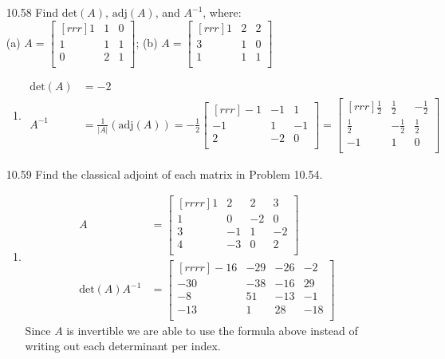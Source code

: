 \documentclass[12pt]{article}
\theoremstyle{definition}
\theoremstyle{plain}
\begin{document}
\begin{enumerate}
\item[10.58]Find $\mathrm{det}(A)$, $\mathrm{adj}(A)$, and $A^{-1}$, where:\\
(a) $A=\begin{bmatrix}[rrr]1&1&0\\1&1&1\\0&2&1\\\end{bmatrix}$; (b) $A=\begin{bmatrix}[rrr]1&2&2\\3&1&0\\1&1&1\\\end{bmatrix}$
	\begin{enumerate}
	\item
	\begin{align*}
	\mathrm{det}(A)&= -2\\
	A^{-1}&=\frac{1}{|A|}(\mathrm{adj}(A))=-\frac{1}{2}\begin{bmatrix}[rrr]-1&-1&1\\-1&1&-1\\2&-2&0\\\end{bmatrix} = \begin{bmatrix}[rrr]\frac{1}{2}&\frac{1}{2}&-\frac{1}{2}\\\frac{1}{2}&-\frac{1}{2}&\frac{1}{2}\\-1&1&0\\\end{bmatrix}
	\end{align*}
	\end{enumerate}		
	
\item[10.59]Find the classical adjoint of each matrix in Problem 10.54.
	\begin{enumerate}
	\item
	\begin{align*}
	A&=\begin{bmatrix}[rrrr]1&2&2&3\\1&0&-2&0\\3&-1&1&-2\\4&-3&0&2\\\end{bmatrix}\\
	\mathrm{det}(A)A^{-1} &= \begin{bmatrix}[rrrr]-16&-29&-26&-2\\-30&-38&-16&29\\-8&51&-13&-1\\-13&1&28&-18\\\end{bmatrix}
	\end{align*}
	Since $A$ is invertible we are able to use the formula above instead of writing out each determinant per index.
	\end{enumerate}		


\end{enumerate}
\end{document}
